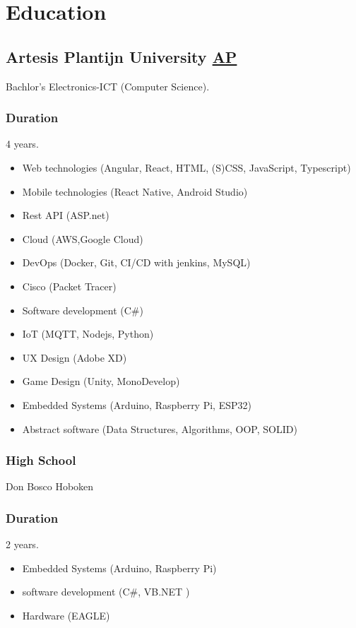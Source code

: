\pagebreak
\section{Educat\textcolor{mycolor}{ion}}
  \subsection{Artesis Plantijn University \href{https://ap.be}{AP}}
    \hspace*{\fill}{\textcolor{mygrey}{2018-2022}}

    Bachlor's Electronics-ICT (Computer Science).
    \subsubsection{Duration}
      4 years.
      \begin{itemize}
        \item Web technologies (Angular, React, HTML, (S)CSS, JavaScript, Typescript)
        \item Mobile technologies (React Native, Android Studio)
        \item Rest API (ASP.net)
        \item Cloud (AWS,Google Cloud)
        \item DevOps (Docker, Git, CI/CD with jenkins, MySQL)
        \item Cisco (Packet Tracer)
        \item Software development (C\#)
        \item IoT (MQTT, Nodejs, Python)
        \item UX Design (Adobe XD)
        \item Game Design (Unity, MonoDevelop)
        \item Embedded Systems (Arduino, Raspberry Pi, ESP32)
        \item Abstract software (Data Structures, Algorithms, OOP, SOLID)
      \end{itemize}
  \subsubsection{High School}
      Don Bosco Hoboken
    \subsubsection{Duration}
      2 years.
      \begin{itemize}
        \item Embedded Systems (Arduino, Raspberry Pi)
        \item software development (C\#, VB.NET )
        \item Hardware (EAGLE)
      \end{itemize}
